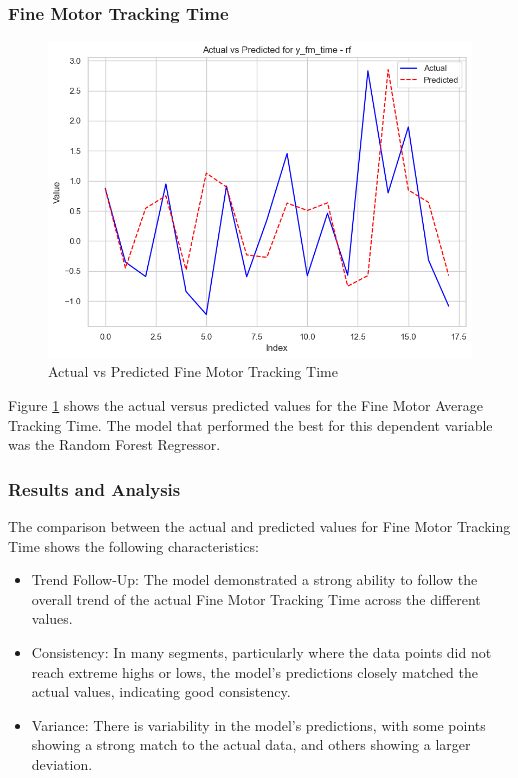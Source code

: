 \subsubsection*{Fine Motor Tracking Time}

\begin{figure}[H]
    \centering
    \includegraphics[width=1\textwidth]{images/output_y_fm_time_rf.png}
    \caption{Actual vs Predicted Fine Motor Tracking Time}
    \label{fig:actual_vs_predicted_fm_avg_trk_time}
\end{figure}

Figure \ref{fig:actual_vs_predicted_fm_avg_trk_time} shows the actual versus predicted values for the Fine Motor Average Tracking Time. The model that performed the best for this dependent
variable was the Random Forest Regressor. 

\subsubsection*{Results and Analysis}
The comparison between the actual and predicted values for Fine Motor Tracking Time shows the following characteristics:

\begin{itemize}
    \item Trend Follow-Up: The model demonstrated a strong ability to follow the overall trend of the actual Fine Motor Tracking Time across the different values. 
    \item Consistency: In many segments, particularly where the data points did not reach extreme highs or lows, the model's predictions closely matched the actual values, indicating good consistency. 
    \item Variance: There is variability in the model's predictions, with some points showing a strong match to the actual data, and others showing a larger deviation.
\end{itemize}

